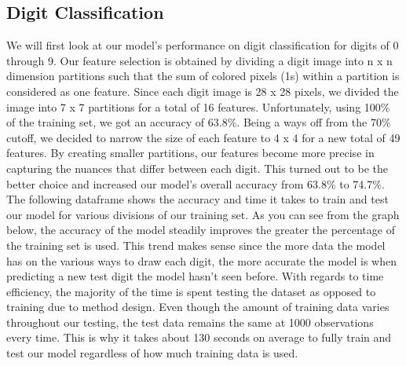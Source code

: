 \documentclass[10pt,parskip=half,
toc=sectionentrywithdots,
bibliography=totocnumbered,
captions=tableheading,numbers=noendperiod]{scrartcl}
\begin{document}
\hypertarget{digit-classification}{%
\subsection{Digit Classification}\label{digit-classification}}

We will first look at our model's performance on digit classification
for digits of 0 through 9. Our feature selection is obtained by dividing
a digit image into n x n dimension partitions such that the sum of
colored pixels (1s) within a partition is considered as one feature.
Since each digit image is 28 x 28 pixels, we divided the image into 7 x
7 partitions for a total of 16 features. Unfortunately, using 100\% of
the training set, we got an accuracy of 63.8\%. Being a ways off from
the 70\% cutoff, we decided to narrow the size of each feature to 4 x 4
for a new total of 49 features. By creating smaller partitions, our
features become more precise in capturing the nuances that differ
between each digit. This turned out to be the better choice and
increased our model's overall accuracy from 63.8\% to 74.7\%. The
following dataframe shows the accuracy and time it takes to train and
test our model for various divisions of our training set. As you can see
from the graph below, the accuracy of the model steadily improves the
greater the percentage of the training set is used. This trend makes
sense since the more data the model has on the various ways to draw each
digit, the more accurate the model is when predicting a new test digit
the model hasn't seen before. With regards to time efficiency, the
majority of the time is spent testing the dataset as opposed to training
due to method design. Even though the amount of training data varies
throughout our testing, the test data remains the same at 1000
observations every time. This is why it takes about 130 seconds on
average to fully train and test our model regardless of how much
training data is used.
\end{document}
